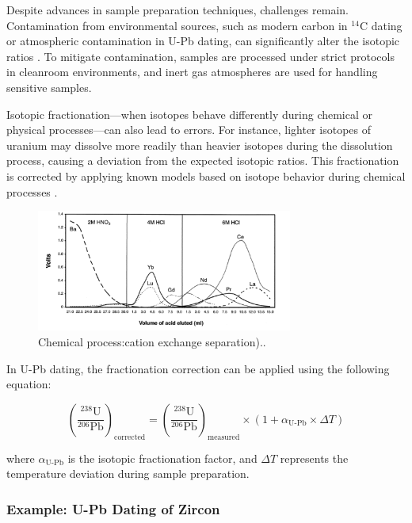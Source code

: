 \documentclass{article}
\begin{document}
Despite advances in sample preparation techniques, challenges remain. Contamination from environmental sources, such as modern carbon in \(^{14}\text{C}\) dating or atmospheric contamination in U-Pb dating, can significantly alter the isotopic ratios \cite{Dodson1973}. To mitigate contamination, samples are processed under strict protocols in cleanroom environments, and inert gas atmospheres are used for handling sensitive samples.

Isotopic fractionation—when isotopes behave differently during chemical or physical processes—can also lead to errors. For instance, lighter isotopes of uranium may dissolve more readily than heavier isotopes during the dissolution process, causing a deviation from the expected isotopic ratios. This fractionation is corrected by applying known models based on isotope behavior during chemical processes \cite{Rutherford2002}.

\begin{figure}[htbp]
    \centering
    \includegraphics[width=0.75\textwidth]{Chemical_process.png}
    \caption{Chemical process:cation exchange separation).\cite{Rutherford2002}.}
    \label{fig:Chemical_process}
\end{figure}

In U-Pb dating, the fractionation correction can be applied using the following equation:

\[
\left(\frac{^{238}\text{U}}{^{206}\text{Pb}}\right)_{\text{corrected}} = \left(\frac{^{238}\text{U}}{^{206}\text{Pb}}\right)_{\text{measured}} \times \left(1 + \alpha_{\text{U-Pb}} \times \Delta T\right)
\]

where \( \alpha_{\text{U-Pb}} \) is the isotopic fractionation factor, and \( \Delta T \) represents the temperature deviation during sample preparation.

\subsubsection*{Example: U-Pb Dating of Zircon}
\end{document}
